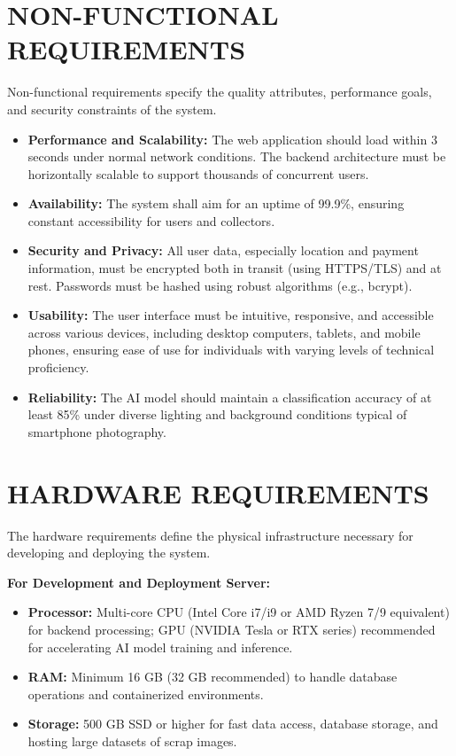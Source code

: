 \section{NON-FUNCTIONAL REQUIREMENTS}
Non-functional requirements specify the quality attributes, performance goals, and security constraints of the system.
\begin{itemize}
    \item \textbf{Performance and Scalability:} The web application should load within 3 seconds under normal network conditions. The backend architecture must be horizontally scalable to support thousands of concurrent users.
    \item \textbf{Availability:} The system shall aim for an uptime of 99.9\%, ensuring constant accessibility for users and collectors.
    \item \textbf{Security and Privacy:} All user data, especially location and payment information, must be encrypted both in transit (using HTTPS/TLS) and at rest. Passwords must be hashed using robust algorithms (e.g., bcrypt).
    \item \textbf{Usability:} The user interface must be intuitive, responsive, and accessible across various devices, including desktop computers, tablets, and mobile phones, ensuring ease of use for individuals with varying levels of technical proficiency.
    \item \textbf{Reliability:} The AI model should maintain a classification accuracy of at least 85\% under diverse lighting and background conditions typical of smartphone photography.
\end{itemize}

\section{HARDWARE REQUIREMENTS}
The hardware requirements define the physical infrastructure necessary for developing and deploying the system.

\textbf{For Development and Deployment Server:}
\begin{itemize}
    \item \textbf{Processor:} Multi-core CPU (Intel Core i7/i9 or AMD Ryzen 7/9 equivalent) for backend processing; GPU (NVIDIA Tesla or RTX series) recommended for accelerating AI model training and inference.
    \item \textbf{RAM:} Minimum 16 GB (32 GB recommended) to handle database operations and containerized environments.
    \item \textbf{Storage:} 500 GB SSD or higher for fast data access, database storage, and hosting large datasets of scrap images.
\end{itemize}

